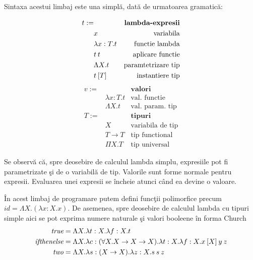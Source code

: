 Sintaxa acestui limbaj este una simpl\u a, dat\u a de urmatoarea gramatic\u a:

\begin{multicols}{2}
\setlength\columnseprule{.4pt}
\begin{align*}
t :=  &                  &\textbf{lambda-expresii}\\
      &x                 &\text{variabila}\\
      &\lambda x:T . t   &\text{functie lambda}\\
      &t\hspace{2pt} t    &\text{aplicare functie}\\
      &\Lambda X . t     &\text{paramtetrizare tip}\\
      &t\hspace{2pt} [T]  &\text{instantiere tip}
\end{align*}
\begin{align*}
v :=  &                  &\textbf{valori}\\
      &\lambda x:T . t   &\text{val. functie}\\
      &\Lambda X . t     &\text{val. param. tip}\\
T :=  &                  &\textbf{tipuri}\\
      &X                 &\text{variabila de tip}\\
      &T\to T            &\text{tip functional}\\
      &\Pi X.T       &\text{tip universal}
\end{align*}
\end{multicols}

Se observ\u a c\u a, spre deosebire de calculul lambda simplu, expresiile pot fi parametrizate \c si de o variabil\u a de tip. Valorile sunt forme normale pentru expresii. Evaluarea unei expresii se \^ incheie atunci c\^ and ea devine o valoare.

\begin{example}\label{church_numbers}
\^ In acest limbaj de programare putem defini func\c tii polimorfice precum $id = \Lambda X . (\lambda x:X . x) $. De asemenea, spre deosebire de calculul lambda cu tipuri simple aici se pot exprima numere naturale \c si valori booleene \^ in forma Church
\begin{align*}
    \emph{true} &= \Lambda X.\lambda t:X.\lambda f:X.t                     \\
    \emph{ifthenelse}   &= \Lambda X . \lambda c : (\forall X. X \to X \to X). \lambda t : X.\lambda f : X . x\hspace{2pt} [X]\hspace{2pt} y\hspace{2pt} z\\
    \emph{two}  &= \Lambda X.\lambda s:(X \to X).\lambda z:X . s\hspace{2pt} s\hspace{2pt} z \\
\end{align*}
\end{example}


